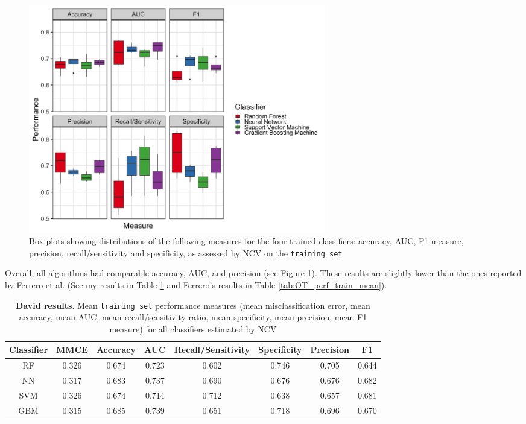\begin{figure}[H]
    \centering
    \includegraphics[width = 13cm]{pics/BenchmarkOtherBoxplots.png}
    \caption{Box plots showing distributions of the following measures for the four trained classifiers: accuracy, AUC, F1 measure, precision, recall/sensitivity and specificity, as assessed by NCV on the \texttt{training set} \label{fig:OT_OtherPlots}}
\end{figure}

Overall, all algorithms had comparable accuracy, AUC, and precision (see Figure \ref{fig:OT_OtherPlots}). These results are slightly lower than the ones reported by Ferrero et al. \cite{ferrero2017} (See my results in Table \ref{tab:David_perf_train_mean} and Ferrero's results in Table \ref{tab:OT_perf_train_mean}). 

\begin{table}[H]
\centering
\begin{tabular}{c|c|c|c|c|c|c|c}
Classifier & MMCE  & Accuracy   & AUC   & Recall/Sensitivity   & Specificity   & Precision   & F1    \\
\hline
RF & 0.326 & 0.674 & 0.723 & 0.602 & 0.746 & 0.705 & 0.644 \\
NN & 0.317 & 0.683 & 0.737 & 0.690 & 0.676 & 0.676 & 0.682 \\
SVM & 0.326 & 0.674 & 0.714 & 0.712 & 0.638 & 0.657 & 0.681 \\
GBM & 0.315 & 0.685 & 0.739 & 0.651 & 0.718 & 0.696 & 0.670
\end{tabular}
\caption{\textbf{David results}. Mean \texttt{training set} performance measures (mean misclassification error, mean accuracy, mean AUC, mean recall/sensitivity ratio, mean specificity, mean precision, mean F1 measure) for all classifiers estimated by NCV \label{tab:David_perf_train_mean}}
\end{table}


